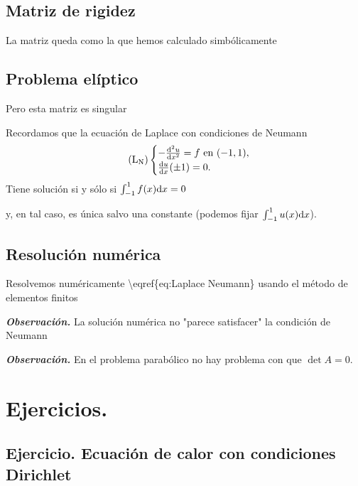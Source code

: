 \subsection{Matriz de rigidez
}\label{matriz-de-rigidez-scrollabel}

La matriz queda como la que hemos calculado simbólicamente


\subsection{Problema elíptico
}\label{problema-eluxedptico-scrollable}

Pero esta matriz es singular




Recordamos que la ecuación de Laplace con condiciones de Neumann \[
    \tag{L$_\textrm{N}$}
    \label{eq:Laplace Neumann}
    \begin{cases}
        -\frac{\diff^2 u}{\diff x^2} = f \text{ en } (-1,1) , \\
        \frac{\diff u}{\diff x}(\pm 1) = 0.
    \end{cases}
\] Tiene solución si y sólo si \(\int_{-1}^1 f(x) \mathrm{d} x = 0\)

y, en tal caso, es única salvo una constante (podemos fijar
\(\int_{-1}^1 u(x) \mathrm{d} x\)).

\subsection{Resolución numérica}\label{resoluciuxf3n-numuxe9rica}

Resolvemos numéricamente \textbackslash eqref\{eq:Laplace Neumann\}
usando el método de elementos finitos





\textbf{\emph{Observación.}} La solución numérica no "parece satisfacer"
la condición de Neumann



\textbf{\emph{Observación.}} En el problema parabólico no hay problema
con que \(\det A = 0\).

\section{Ejercicios.}\label{ejercicios}

\subsection{Ejercicio. Ecuación de calor con condiciones
    Dirichlet}\label{ejercicio-ecuaciuxf3n-de-calor-con-condiciones-dirichlet}

